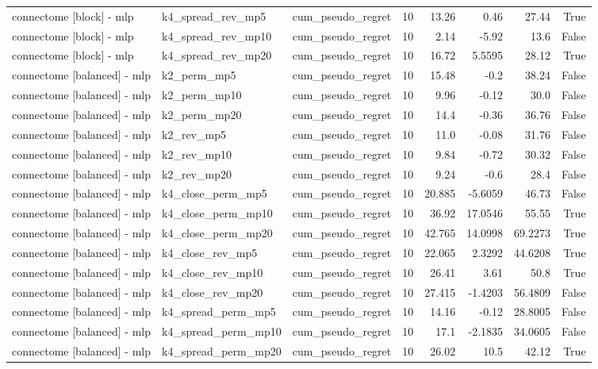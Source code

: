 \begin{table}[t]
\begin{tabular}{lllrrrrr}
connectome [block] - mlp & k4\_spread\_rev\_mp5 & cum\_pseudo\_regret & 10 & 13.26 & 0.46 & 27.44 & True \\
connectome [block] - mlp & k4\_spread\_rev\_mp10 & cum\_pseudo\_regret & 10 & 2.14 & -5.92 & 13.6 & False \\
connectome [block] - mlp & k4\_spread\_rev\_mp20 & cum\_pseudo\_regret & 10 & 16.72 & 5.5595 & 28.12 & True \\
connectome [balanced] - mlp & k2\_perm\_mp5 & cum\_pseudo\_regret & 10 & 15.48 & -0.2 & 38.24 & False \\
connectome [balanced] - mlp & k2\_perm\_mp10 & cum\_pseudo\_regret & 10 & 9.96 & -0.12 & 30.0 & False \\
connectome [balanced] - mlp & k2\_perm\_mp20 & cum\_pseudo\_regret & 10 & 14.4 & -0.36 & 36.76 & False \\
connectome [balanced] - mlp & k2\_rev\_mp5 & cum\_pseudo\_regret & 10 & 11.0 & -0.08 & 31.76 & False \\
connectome [balanced] - mlp & k2\_rev\_mp10 & cum\_pseudo\_regret & 10 & 9.84 & -0.72 & 30.32 & False \\
connectome [balanced] - mlp & k2\_rev\_mp20 & cum\_pseudo\_regret & 10 & 9.24 & -0.6 & 28.4 & False \\
connectome [balanced] - mlp & k4\_close\_perm\_mp5 & cum\_pseudo\_regret & 10 & 20.885 & -5.6059 & 46.73 & False \\
connectome [balanced] - mlp & k4\_close\_perm\_mp10 & cum\_pseudo\_regret & 10 & 36.92 & 17.0546 & 55.55 & True \\
connectome [balanced] - mlp & k4\_close\_perm\_mp20 & cum\_pseudo\_regret & 10 & 42.765 & 14.0998 & 69.2273 & True \\
connectome [balanced] - mlp & k4\_close\_rev\_mp5 & cum\_pseudo\_regret & 10 & 22.065 & 2.3292 & 44.6208 & True \\
connectome [balanced] - mlp & k4\_close\_rev\_mp10 & cum\_pseudo\_regret & 10 & 26.41 & 3.61 & 50.8 & True \\
connectome [balanced] - mlp & k4\_close\_rev\_mp20 & cum\_pseudo\_regret & 10 & 27.415 & -1.4203 & 56.4809 & False \\
connectome [balanced] - mlp & k4\_spread\_perm\_mp5 & cum\_pseudo\_regret & 10 & 14.16 & -0.12 & 28.8005 & False \\
connectome [balanced] - mlp & k4\_spread\_perm\_mp10 & cum\_pseudo\_regret & 10 & 17.1 & -2.1835 & 34.0605 & False \\
connectome [balanced] - mlp & k4\_spread\_perm\_mp20 & cum\_pseudo\_regret & 10 & 26.02 & 10.5 & 42.12 & True \\

\end{tabular}
\end{table}
